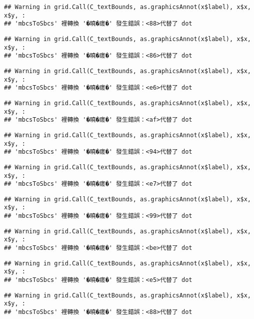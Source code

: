 \documentclass[
]{article}
\begin{document}
\begin{verbatim}
## Warning in grid.Call(C_textBounds, as.graphicsAnnot(x$label), x$x, x$y, :
## 'mbcsToSbcs' 裡轉換 '�曉�瘥�' 發生錯誤：<88>代替了 dot
\end{verbatim}

\begin{verbatim}
## Warning in grid.Call(C_textBounds, as.graphicsAnnot(x$label), x$x, x$y, :
## 'mbcsToSbcs' 裡轉換 '�曉�瘥�' 發生錯誤：<86>代替了 dot
\end{verbatim}

\begin{verbatim}
## Warning in grid.Call(C_textBounds, as.graphicsAnnot(x$label), x$x, x$y, :
## 'mbcsToSbcs' 裡轉換 '�曉�瘥�' 發生錯誤：<e6>代替了 dot
\end{verbatim}

\begin{verbatim}
## Warning in grid.Call(C_textBounds, as.graphicsAnnot(x$label), x$x, x$y, :
## 'mbcsToSbcs' 裡轉換 '�曉�瘥�' 發生錯誤：<af>代替了 dot
\end{verbatim}

\begin{verbatim}
## Warning in grid.Call(C_textBounds, as.graphicsAnnot(x$label), x$x, x$y, :
## 'mbcsToSbcs' 裡轉換 '�曉�瘥�' 發生錯誤：<94>代替了 dot
\end{verbatim}

\begin{verbatim}
## Warning in grid.Call(C_textBounds, as.graphicsAnnot(x$label), x$x, x$y, :
## 'mbcsToSbcs' 裡轉換 '�曉�瘥�' 發生錯誤：<e7>代替了 dot
\end{verbatim}

\begin{verbatim}
## Warning in grid.Call(C_textBounds, as.graphicsAnnot(x$label), x$x, x$y, :
## 'mbcsToSbcs' 裡轉換 '�曉�瘥�' 發生錯誤：<99>代替了 dot
\end{verbatim}

\begin{verbatim}
## Warning in grid.Call(C_textBounds, as.graphicsAnnot(x$label), x$x, x$y, :
## 'mbcsToSbcs' 裡轉換 '�曉�瘥�' 發生錯誤：<be>代替了 dot
\end{verbatim}

\begin{verbatim}
## Warning in grid.Call(C_textBounds, as.graphicsAnnot(x$label), x$x, x$y, :
## 'mbcsToSbcs' 裡轉換 '�曉�瘥�' 發生錯誤：<e5>代替了 dot
\end{verbatim}

\begin{verbatim}
## Warning in grid.Call(C_textBounds, as.graphicsAnnot(x$label), x$x, x$y, :
## 'mbcsToSbcs' 裡轉換 '�曉�瘥�' 發生錯誤：<88>代替了 dot
\end{verbatim}
\end{document}
